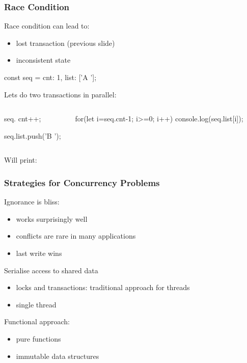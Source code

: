 \begin{frame}[fragile] \frametitle{Race Condition}
Race condition can lead to:
\begin{itemize}
  \item lost transaction (previous slide)
  \item inconsistent state
\end{itemize}
\vspace{3mm}

\begin{CodeBox}{}
const seq = {cnt: 1, list: ['A ']};
\end{CodeBox}
Lets do two transactions in parallel:
  \begin{columns}[onlytextwidth]
    \begin{column}{0.4\textwidth}
      \begin{CodeBox}{}
seq. cnt++;



seq.list.push('B ');
      \end{CodeBox}
    \end{column}
  \begin{column}{0.55\textwidth}
    \begin{CodeBox}{}
for(let i=seq.cnt-1; i>=0; i++){
  console.log(seq.list[i]);
}
    \end{CodeBox}
    \end{column}
    \begin{column}{0.3\textwidth}  \end{column}
  \end{columns}%
\vspace{3mm}
Will print: 
\end{frame}

\begin{frame}[fragile] \frametitle{Strategies for Concurrency Problems}
Ignorance is bliss:
\begin{itemize}
  \item works surprisingly well
  \item conflicts are rare in many applications
  \item last write wins
\end{itemize}
\vspace{3mm}
Serialise access to shared data
\begin{itemize}
  \item locks and transactions: traditional approach for threads
  \item single thread
\end{itemize}
\vspace{3mm}
Functional approach:
\begin{itemize}
  \item pure functions
  \item immutable data structures
\end{itemize}
\end{frame}

